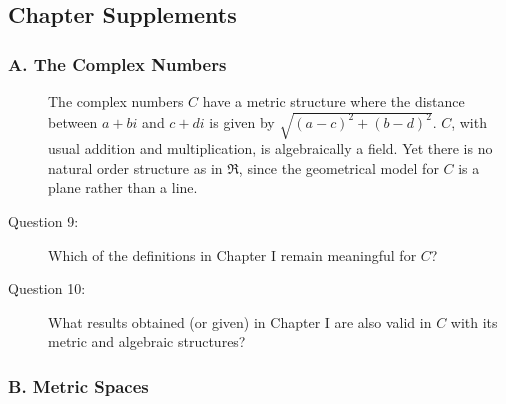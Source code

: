 \documentclass{article}
\begin{document}
\subsection*{Chapter Supplements}


\subsubsection*{A. The Complex Numbers}

\begin{description}

  \item[] The complex numbers $C$ have a metric structure where the distance between $a+bi$ and $c+di$ is given by $\sqrt{(a-c)^2 + (b-d)^2}$. $C$, with usual addition and multiplication, is algebraically a field. Yet there is no natural order structure as in $\Re$, since the geometrical model for $C$ is a plane rather than a line.

  \item[Question 9:] Which of the definitions in Chapter I remain meaningful for $C$?

  \item[Question 10:] What results obtained (or given) in Chapter I are also valid in $C$ with its metric and algebraic structures?

\end{description}


\subsubsection*{B. Metric Spaces}
\end{document}
